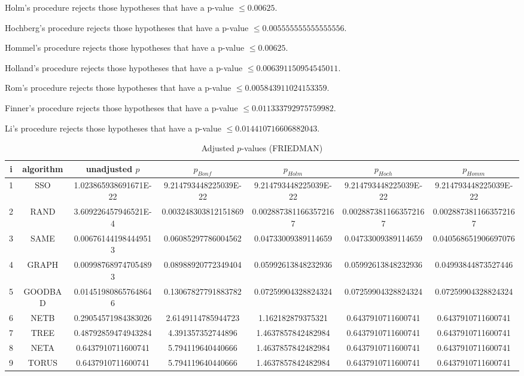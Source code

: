 \documentclass[a4paper,10pt]{article}
\begin{document}
\begin{landscape}
Holm's procedure rejects those hypotheses that have a p-value $\le0.00625$.


Hochberg's procedure rejects those hypotheses that have a p-value $\le0.005555555555555556$.


Hommel's procedure rejects those hypotheses that have a p-value $\le0.00625$.


Holland's procedure rejects those hypotheses that have a p-value $\le0.006391150954545011$.


Rom's procedure rejects those hypotheses that have a p-value $\le0.005843911024153359$.


Finner's procedure rejects those hypotheses that have a p-value $\le0.011333792975759982$.


Li's procedure rejects those hypotheses that have a p-value $\le0.014410716606882043$.



\newpage

\begin{table}[!htp]
\centering\scriptsize
\caption{Adjusted $p$-values (FRIEDMAN)}
\begin{tabular}{ccccccc}
i&algorithm&unadjusted $p$&$p_{Bonf}$&$p_{Holm}$&$p_{Hoch}$&$p_{Homm}$\\
\hline
1& SSO&1.023865938691671E-22&9.214793448225039E-22&9.214793448225039E-22&9.214793448225039E-22&9.214793448225039E-22\\
2& RAND&3.609226457946521E-4&0.003248303812151869&0.0028873811663572167&0.0028873811663572167&0.0028873811663572167\\
3& SAME&0.006761441984449513&0.06085297786004562&0.04733009389114659&0.04733009389114659&0.040568651906697076\\
4& GRAPH&0.009987689747054893&0.08988920772349404&0.05992613848232936&0.05992613848232936&0.04993844873527446\\
5& GOODBAD&0.014519808657648646&0.13067827791883782&0.07259904328824324&0.07259904328824324&0.07259904328824324\\
6& NETB&0.29054571984383026&2.6149114785944723&1.162182879375321&0.6437910711600741&0.6437910711600741\\
7& TREE&0.48792859474943284&4.391357352744896&1.4637857842482984&0.6437910711600741&0.6437910711600741\\
8& NETA&0.6437910711600741&5.794119640440666&1.4637857842482984&0.6437910711600741&0.6437910711600741\\
9& TORUS&0.6437910711600741&5.794119640440666&1.4637857842482984&0.6437910711600741&0.6437910711600741\\
\hline
\end{tabular}
\end{table}


\end{landscape}
\end{document}
